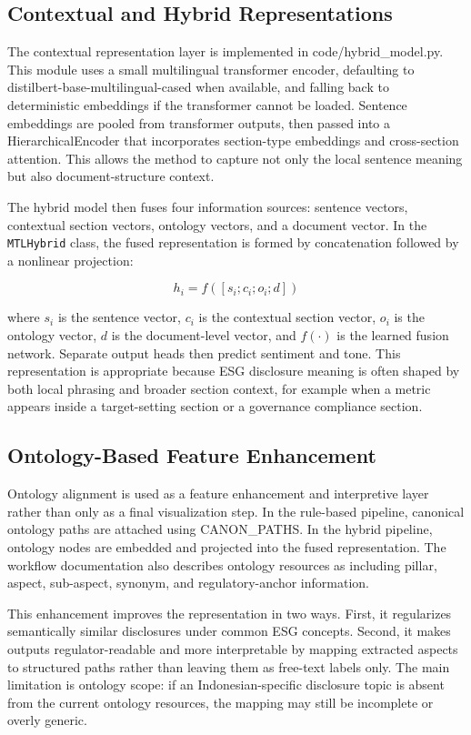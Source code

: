 \documentclass[english, online, cse, master]{dithesis}
\begin{document}
\subsection{Contextual and Hybrid Representations}

The contextual representation layer is implemented in code/hybrid\_model.py. This module uses a small multilingual transformer encoder, defaulting to distilbert-base-multilingual-cased when available, and falling back to deterministic embeddings if the transformer cannot be loaded. Sentence embeddings are pooled from transformer outputs, then passed into a HierarchicalEncoder that incorporates section-type embeddings and cross-section attention. This allows the method to capture not only the local sentence meaning but also document-structure context.

The hybrid model then fuses four information sources: sentence vectors,
contextual section vectors, ontology vectors, and a document vector. In the
\texttt{MTLHybrid} class, the fused representation is formed by concatenation
followed by a nonlinear projection:

\[
h_i = f\left([s_i ; c_i ; o_i ; d]\right)
\]

where \(s_i\) is the sentence vector, \(c_i\) is the contextual section vector,
\(o_i\) is the ontology vector, \(d\) is the document-level vector, and
\(f(\cdot)\) is the learned fusion network. Separate output heads then predict
sentiment and tone. This representation is appropriate because ESG disclosure
meaning is often shaped by both local phrasing and broader section context,
for example when a metric appears inside a target-setting section or a
governance compliance section.

\subsection{Ontology-Based Feature Enhancement}

Ontology alignment is used as a feature enhancement and interpretive layer rather than only as a final visualization step. In the rule-based pipeline, canonical ontology paths are attached using CANON\_PATHS. In the hybrid pipeline, ontology nodes are embedded and projected into the fused representation. The workflow documentation also describes ontology resources as including pillar, aspect, sub-aspect, synonym, and regulatory-anchor information.

This enhancement improves the representation in two ways. First, it regularizes semantically similar disclosures under common ESG concepts. Second, it makes outputs regulator-readable and more interpretable by mapping extracted aspects to structured paths rather than leaving them as free-text labels only. The main limitation is ontology scope: if an Indonesian-specific disclosure topic is absent from the current ontology resources, the mapping may still be incomplete or overly generic.
\end{document}
